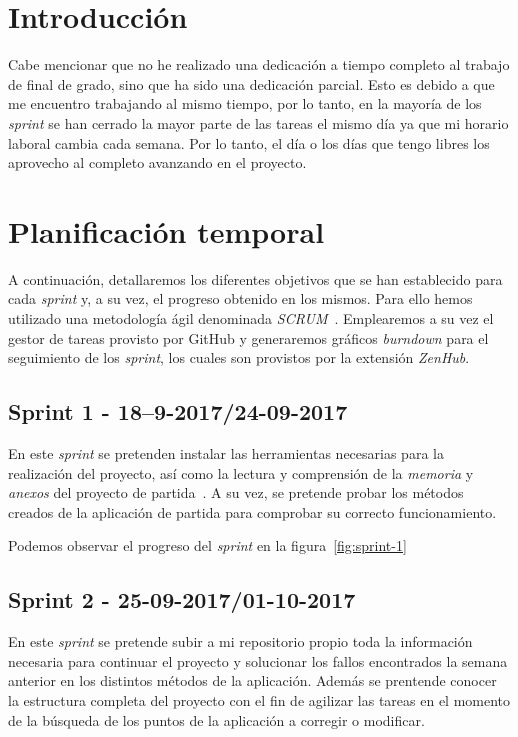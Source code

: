 
\section{Introducción}
Cabe mencionar que no he realizado una dedicación a tiempo completo al trabajo de final de grado, sino que ha sido una dedicación parcial. Esto es debido a que me encuentro trabajando al mismo tiempo, por lo tanto, en la mayoría de los \textit{sprint} se han cerrado la mayor parte de las tareas el mismo día ya que mi horario laboral cambia cada semana. Por lo tanto, el día o los días que tengo libres los aprovecho al completo avanzando en el proyecto.

\section{Planificación temporal}
A continuación, detallaremos los diferentes objetivos que se han establecido para cada \textit{sprint} y, a su vez, el progreso obtenido en los mismos. Para ello hemos utilizado una metodología ágil denominada \textit{SCRUM}~\cite{schwaber2002agile}. Emplearemos a su vez el gestor de tareas provisto por GitHub y generaremos gráficos \textit{burndown} para el seguimiento de los \textit{sprint}, los cuales son provistos por la extensión \textit{ZenHub}.

\subsection{Sprint 1 - 18--9-2017/24-09-2017}
En este \textit{sprint} se pretenden instalar las herramientas necesarias para la realización del proyecto, así como la lectura y comprensión de la \textit{memoria} y \textit{anexos} del proyecto de partida~\cite{github:alberto-viewer}. A su vez, se pretende probar los métodos creados de la aplicación de partida para comprobar su correcto funcionamiento.

Podemos observar el progreso del \textit{sprint} en la figura~\ref{fig:sprint-1}

\subsection{Sprint 2 - 25-09-2017/01-10-2017}
En este \textit{sprint} se pretende subir a mi repositorio propio toda la información necesaria para continuar el proyecto y solucionar los fallos encontrados la semana anterior en los distintos métodos de la aplicación. Además se prentende conocer la estructura completa del proyecto con el fin de agilizar las tareas en el momento de la búsqueda de los puntos de la aplicación a corregir o modificar.

